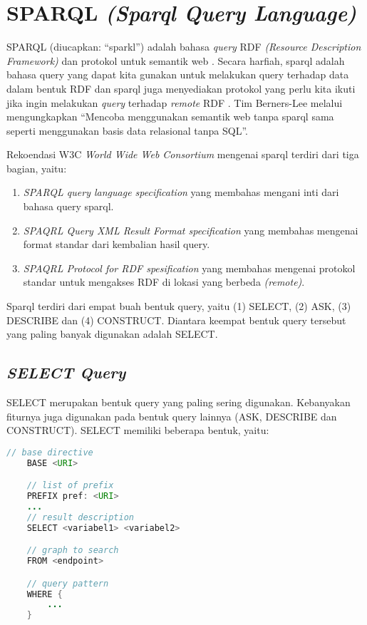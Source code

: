 \section{SPARQL \emph{(Sparql Query Language)}}
SPARQL (diucapkan: ``sparkl'') adalah bahasa \emph{query} RDF \emph{(Resource Description Framework)} dan protokol untuk semantik web \citep{liyang_yu}. Secara harfiah, sparql adalah bahasa query yang dapat kita gunakan untuk melakukan query terhadap data dalam bentuk RDF dan sparql juga menyediakan protokol yang perlu kita ikuti jika ingin melakukan \emph{query} terhadap \emph{remote} RDF \citep{liyang_yu}. Tim Berners-Lee melalui \citet{ducharme} mengungkapkan ``Mencoba menggunakan semantik web tanpa sparql sama seperti menggunakan basis data relasional tanpa SQL''.

Rekoendasi W3C \emph{World Wide Web Consortium} mengenai sparql terdiri dari tiga bagian, yaitu:

\begin{enumerate}
	\item \emph{SPARQL query language specification} yang membahas mengani inti dari bahasa query sparql.
	\item \emph{SPAQRL Query XML Result Format specification} yang membahas mengenai format standar dari kembalian hasil query.
	\item \emph{SPAQRL Protocol for RDF spesification} yang membahas mengenai protokol standar untuk mengakses RDF di lokasi yang berbeda \emph{(remote)}.
\end{enumerate}

Sparql terdiri dari empat buah bentuk query, yaitu (1) SELECT, (2) ASK, (3) DESCRIBE dan (4) CONSTRUCT. Diantara keempat bentuk query tersebut yang paling banyak digunakan adalah SELECT.

\subsection{\emph{SELECT Query}}
SELECT merupakan bentuk query yang paling sering digunakan. Kebanyakan fiturnya juga digunakan pada bentuk query lainnya (ASK, DESCRIBE dan CONSTRUCT). SELECT memiliki beberapa bentuk, yaitu:

\begin{lstlisting}[language=JAVA]
 	// base directive
 	BASE <URI>

 	// list of prefix 
 	PREFIX pref: <URI>
 	...
 	// result description
 	SELECT <variabel1> <variabel2>

 	// graph to search
 	FROM <endpoint>

 	// query pattern
 	WHERE {
 		...
 	}
\end{lstlisting} 


